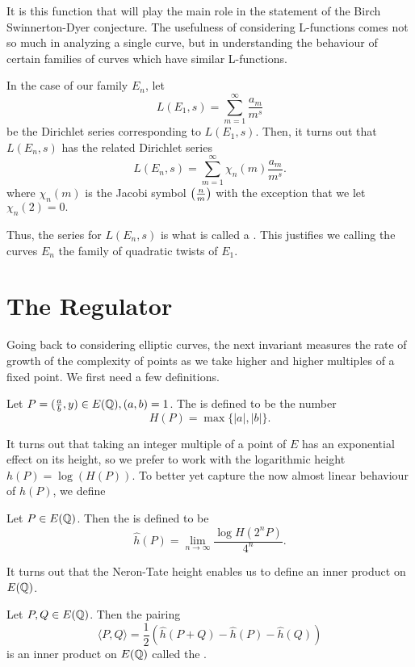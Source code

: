 \documentclass[12pt, a4paper]{report}
\begin{document}
It is this function that will play the main role in the statement of the Birch
Swinnerton-Dyer conjecture. The usefulness of considering L-functions comes not
so much in analyzing a single curve, but in understanding the behaviour of
certain families of curves which have similar L-functions.

In the case of our family $E_n$, let
\[L(E_1,s) = \sum\limits_{m=1}^\infty \frac{a_m}{m^s}\]
be the Dirichlet series corresponding to $L(E_1,s)$. Then, it turns out that
$L(E_n,s)$ has the related Dirichlet series
\[L(E_n,s) = \sum_{m=1}^\infty \chi_n(m) \frac{a_m}{m^s}. \]
where $\chi_n(m)$ is the Jacobi symbol
$\left(\frac{n}{m}\right)$ with the exception that we let $\chi_n(2) = 0.$

Thus, the series for $L(E_n,s)$ is what is called a . This justifies we calling
the curves $E_n$ the family of quadratic twists of $E_1$.

\section{The Regulator}

Going back to considering elliptic curves, the next invariant measures the
rate of growth of the complexity of points as we take higher and higher
multiples of a fixed point. We first need a few definitions.

\begin{defn}
  Let $P = (\frac{a}{b},y) \in E({\mathbb Q}), (a,b) = 1$. The  is
  defined to be the number
  \[ H(P) = \max \{|a|, |b| \}.\]
\end{defn}

It turns out that taking an integer multiple of a point of $E$ has an
exponential effect on its height, so we prefer to work with the logarithmic
height $h(P) = \log (H(P))$. To better yet capture the now almost linear
behaviour of $h(P)$, we define

\begin{defn}
  Let $P \in E({\mathbb Q})$. Then the  is defined to be
  \[ \hat{h}(P) = \lim\limits_{n \rightarrow \infty} \frac{\log H(2^n P)}{4^n}. \]
\end{defn}

It turns out that the Neron-Tate height enables us to define an inner product
on $E({\mathbb Q})$.

\begin{defn}
  Let $P, Q \in E({\mathbb Q})$. Then the pairing
  \[ \langle P,Q \rangle =
    \frac{1}{2} \left( \hat{h}(P+Q) - \hat{h}(P) - \hat{h}(Q) \right)\]
  is an inner product on $E({\mathbb Q})$ called the .
\end{defn}
\end{document}
